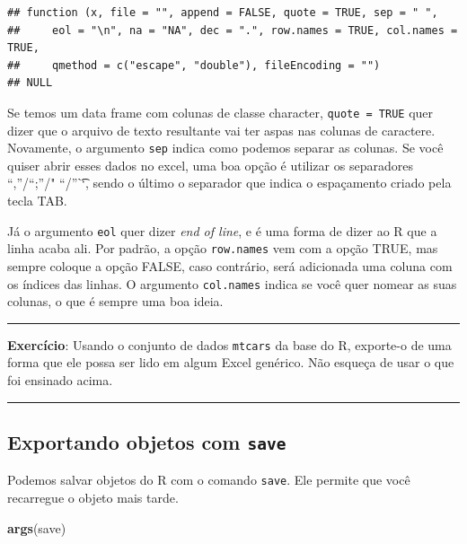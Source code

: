 \documentclass[]{book}
\newenvironment{Shaded}{\begin{snugshade}}{\end{snugshade}}
\newcommand{\KeywordTok}[1]{\textcolor[rgb]{0.13,0.29,0.53}{\textbf{#1}}}
\newcommand{\NormalTok}[1]{#1}
\theoremstyle{definition}
\theoremstyle{definition}
\theoremstyle{definition}
\theoremstyle{remark}
\begin{document}
\begin{verbatim}
## function (x, file = "", append = FALSE, quote = TRUE, sep = " ", 
##     eol = "\n", na = "NA", dec = ".", row.names = TRUE, col.names = TRUE, 
##     qmethod = c("escape", "double"), fileEncoding = "") 
## NULL
\end{verbatim}

Se temos um data frame com colunas de classe character,
\texttt{quote\ =\ TRUE} quer dizer que o arquivo de texto resultante vai
ter aspas nas colunas de caractere. Novamente, o argumento \texttt{sep}
indica como podemos separar as colunas. Se você quiser abrir esses dados
no excel, uma boa opção é utilizar os separadores ``,''/``;''/"
``/''\t``, sendo o último o separador que indica o espaçamento criado
pela tecla TAB.

Já o argumento \texttt{eol} quer dizer \emph{end of line}, e é uma forma
de dizer ao R que a linha acaba ali. Por padrão, a opção
\texttt{row.names} vem com a opção TRUE, mas sempre coloque a opção
FALSE, caso contrário, será adicionada uma coluna com os índices das
linhas. O argumento \texttt{col.names} indica se você quer nomear as
suas colunas, o que é sempre uma boa ideia.

\begin{center}\rule{0.5\linewidth}{\linethickness}\end{center}

\textbf{Exercício}: Usando o conjunto de dados \texttt{mtcars} da base
do R, exporte-o de uma forma que ele possa ser lido em algum Excel
genérico. Não esqueça de usar o que foi ensinado acima.

\begin{center}\rule{0.5\linewidth}{\linethickness}\end{center}

\subsection{\texorpdfstring{Exportando objetos com
\texttt{save}}{Exportando objetos com save}}\label{exportando-objetos-com-save}

Podemos salvar objetos do R com o comando \texttt{save}. Ele permite que
você recarregue o objeto mais tarde.

\begin{Shaded}
\begin{Highlighting}[]
\KeywordTok{args}\NormalTok{(save)}
\end{Highlighting}
\end{Shaded}
\end{document}
